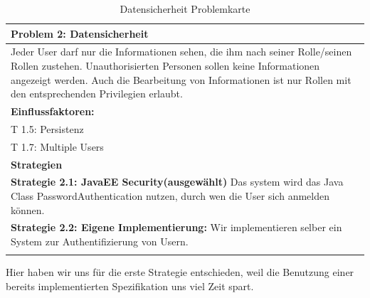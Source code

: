 \documentclass[enabledeprecatedfontcommands,fontsize=12pt,paper=a4,twoside]{scrartcl}
\begin{document}
\begin{table}[H]
    \centering
    \begin{tabular}{|p{15cm}|}
    \hline
          \textbf{Problem 2:} Datensicherheit \\ \hline
          Jeder User darf nur die Informationen sehen, die ihm nach seiner Rolle/seinen Rollen zustehen. Unauthorisierten Personen sollen keine Informationen angezeigt werden. Auch die Bearbeitung von Informationen ist nur Rollen mit den entsprechenden Privilegien erlaubt. \\ \hline
          \textbf{Einflussfaktoren: } \\
          T 1.5: Persistenz \\
          T 1.7: Multiple Users\\
         \hline
          \textbf{Strategien} \\ \hline
          \textbf{Strategie 2.1: JavaEE Security(ausgewählt)} Das system wird das Java Class PasswordAuthentication nutzen, durch wen die User sich anmelden können. \\ %
           \textbf{Strategie 2.2: Eigene Implementierung:} Wir implementieren selber ein System zur Authentifizierung von Usern. \\
          \\ \hline

    \end{tabular}

    \caption{Datensicherheit Problemkarte}

    \label{tab:ProblemKarte2}
\end{table}
Hier haben wir uns für die erste Strategie entschieden, weil die Benutzung einer bereits implementierten Spezifikation uns viel Zeit spart. \\
\end{document}
